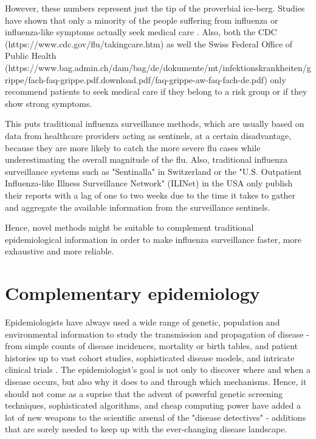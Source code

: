 \documentclass[11pt, a4paper]{report}\usepackage[]{graphicx}\usepackage[]{color}
\begin{document}
However, these numbers represent just the tip of the proverbial ice-berg. Studies have shown that only a minority of the people suffering from influenza or influenza-like symptoms actually seek medical care \citep{goff_surveillance_2015}. Also, both the CDC (https://www.cdc.gov/flu/takingcare.htm) as well the Swiss Federal Office of Public Health (https://www.bag.admin.ch/dam/bag/de/dokumente/mt/infektionskrankheiten/grippe/fach-faq-grippe.pdf.download.pdf/faq-grippe-aw-faq-fach-de.pdf) only recommend patients to seek medical care if they belong to a risk group or if they show strong symptoms.

This puts traditional influenza surveillance methods, which are usually based on data from healthcare providers acting as sentinels, at a certain disadvantage, because they are more likely to catch the more severe flu cases while underestimating the overall magnitude of the flu. Also, traditional influenza surveillance systems such as "Sentinalla" in Switzerland \citep{bundesamt_fur_gesundheit_saisonale_2016-1} or the "U.S. Outpatient Influenza-like Illness Surveillance Network" (ILINet) in the USA \citep{centers_for_disease_control_and_prevention_overview_2016} only publish their reports with a lag of one to two weeks due to the time it takes to gather and aggregate the available information from the surveillance sentinels.

Hence, novel methods might be suitable to complement traditional epidemiological information in order to make influenza surveillance faster, more exhaustive and more reliable. 

\section{Complementary epidemiology}
Epidemiologists have always used a wide range of genetic, population and environmental information to study the transmission and propagation of disease - from simple counts of disease incidences, mortality or birth tables, and patient histories up to vast cohort studies, sophisticated disease models, and intricate clinical trials \citep{rothman2012epidemiology,koepsell2014epidemiologic}. The epidemiologist's goal is not only to discover where and when a disease occurs, but also why it does to and through which mechanisms. Hence, it should not come as a suprise that the advent of powerful genetic screening techniques, sophisticated algorithms, and cheap computing power have added a lot of new weapons to the scientific arsenal of the "disease detectives" \citep{bailey2005introduction, khoury_transforming_2013, gardy_real-time_2015} - additions that are sorely needed to keep up with the ever-changing disease landscape.\newline
\end{document}
